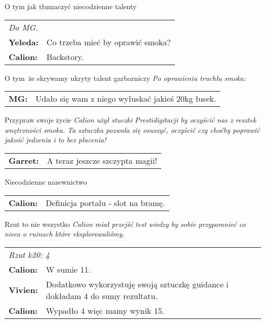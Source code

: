 \documentclass[10pt,twoside,twocolumn]{book}
\begin{document}
\begin{rpg-quotebox}{O tym jak tłumaczyć niecodzienne talenty}
   \begin{tabularx}{\columnwidth}{lX}
      \multicolumn{2}{l}{\textit{Do MG.}}\\
      \textbf{Yeleda:} & Co trzeba mieć by oprawić smoka?\\
      \textbf{Calion:} & Backstory.
   \end{tabularx}
\end{rpg-quotebox}


\begin{rpg-quotebox}{O tym\, że skrywamy ukryty talent garbarniczy}
   \textit{Po oprawieniu truchła smoka:}\\
   
   \begin{tabularx}{\columnwidth}{lX}
      \textbf{MG:} & Udało się wam z niego wyłuskać jakieś 20kg łusek.\\
   \end{tabularx}
\end{rpg-quotebox}


\begin{rpg-quotebox}{Przypraw swoje życie}
   \textit{Calion użył stuczki Prestidigitacji by oczyścić nas z resztek wnętrzności smoka. Ta sztuczka pozwala się osuszyć, oczyścić czy choćby poprawić jakość jedzenia i to bez płacenia!}\\ 
   
   \begin{tabularx}{\columnwidth}{lX}
      \textbf{Garret:} & A teraz jeszcze szczypta magii!\\
   \end{tabularx}
\end{rpg-quotebox}


\begin{rpg-quotebox}{Niecodzienne nazewnictwo}
   \begin{tabularx}{\columnwidth}{lX}
      \textbf{Calion:} & Definicja portalu - slot na bramę.\\
   \end{tabularx}
\end{rpg-quotebox}


\begin{rpg-quotebox}{Rzut to nie wszystko}
   \textit{Calion miał przejść test wiedzy by sobie przypomnieć co nieco o ruinach które eksplorowaliśmy.}\\

   \begin{tabularx}{\columnwidth}{lX}
      \multicolumn{2}{l}{\textit{Rzut k20: 4}} \\ 
      \textbf{Calion:} & W sumie 11.\\
      \textbf{Vivien:} & Dodatkowo wykorzystuję swoją sztuczkę guidance i dokładam 4 do sumy rezultatu.\\
      \textbf{Calion:} & Wypadło 4 więc mamy wynik 15.\\
   \end{tabularx}
\end{rpg-quotebox}
\end{document}
